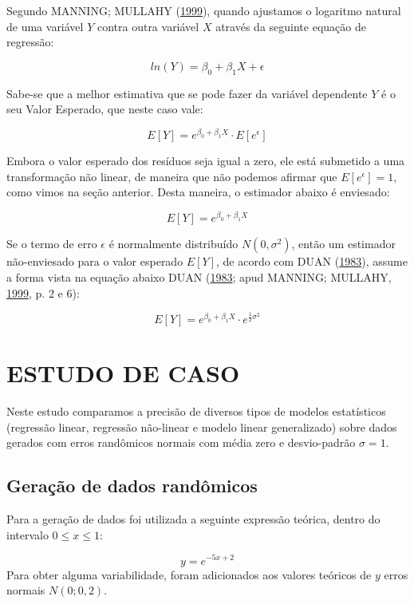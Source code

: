 \documentclass[a4paper]{article}
\begin{document}
Segundo MANNING; MULLAHY (\protect\hyperlink{ref-NBERt0246}{1999}),
quando ajustamos o logaritmo natural de uma variável \(Y\) contra outra
variável \(X\) através da seguinte equação de regressão:

\[ln(Y) = \beta_0 + \beta_1X + \epsilon\]

Sabe-se que a melhor estimativa que se pode fazer da variável dependente
\(Y\) é o seu Valor Esperado, que neste caso vale:

\[E[Y] = e^{\beta_0 + \beta_1X} \cdot E[e^\epsilon]\]

Embora o valor esperado dos resíduos seja igual a zero, ele está
submetido a uma transformação não linear, de maneira que não podemos
afirmar que \(E[e^\epsilon] = 1\), como vimos na seção anterior. Desta
maneira, o estimador abaixo é enviesado:

\[E[Y] = e^{\beta_0 + \beta_1X}\]

Se o termo de erro \(\epsilon\) é normalmente distribuído
\(N(0,\sigma^2)\), então um estimador não-enviesado para o valor
esperado \(E[Y]\), de acordo com DUAN
(\protect\hyperlink{ref-Duan}{1983}), assume a forma vista na equação
abaixo DUAN (\protect\hyperlink{ref-Duan}{1983}; apud MANNING; MULLAHY,
\protect\hyperlink{ref-NBERt0246}{1999}, p. 2 e 6):

\[E[Y] = e^{\beta_0 + \beta_1X} \cdot e^{\frac{1}{2}\sigma^2}\]

\section{ESTUDO DE CASO}\label{estudo-de-caso}

Neste estudo comparamos a precisão de diversos tipos de modelos
estatísticos (regressão linear, regressão não-linear e modelo linear
generalizado) sobre dados gerados com erros randômicos normais com média
zero e desvio-padrão \(\sigma = 1\).

\subsection{Geração de dados
randômicos}\label{geracao-de-dados-randomicos}

Para a geração de dados foi utilizada a seguinte expressão teórica,
dentro do intervalo \(0 \leqslant x \leqslant 1\):

\[y = e^{-5x + 2}\] Para obter alguma variabilidade, foram adicionados
aos valores teóricos de \(y\) erros normais \(N(0;0,2)\).
\end{document}
